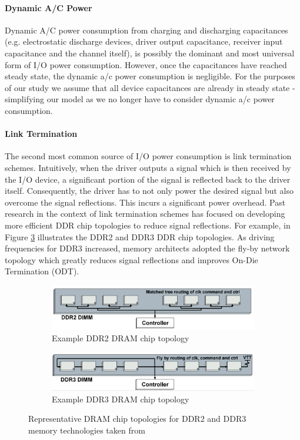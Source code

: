\paragraph{Dynamic A/C Power} Dynamic A/C power consumption from charging and
discharging capacitances (e.g. electrostatic discharge devices, driver output
capacitance, receiver input capacitance and the channel itself), is possibly
the dominant and most universal form of I/O power consumption. However, once
the capacitances have reached steady state, the dynamic a/c power consumption
is negligible. For the purposes of our study we assume that all device
capacitances are already in steady state - simplifying our model as we no
longer have to consider dynamic a/c power consumption.

\paragraph{Link Termination} The second most common source of I/O power
consumption is link termination schemes. Intuitively, when the driver
outputs a signal which is then received by the I/O device, a significant
portion of the signal is reflected back to the driver itself. Consequently, the
driver has to not only power the desired signal but also overcome the signal
reflections.  This incurs a significant power overhead. Past research in the
context of link termination schemes has focused on developing more efficient
DDR chip topologies to reduce signal reflections. For example, in Figure
\ref{dram-chips} illustrates the DDR2 and DDR3 DDR chip topologies. As driving
frequencies for DDR3 increased, memory architects adopted the fly-by network
topology which greatly reduces signal reflections and improves On-Die
Termination (ODT).

\begin{figure}[!htb]
  \centering
  \begin{subfigure}[b]{0.4\textwidth}
    \includegraphics[width=\textwidth]{figs/ddr2-topology}
    \caption{Example DDR2 DRAM chip topology}
    \label{fig:ddr2-chips}
  \end{subfigure}

  \begin{subfigure}[b]{0.4\textwidth}
    \includegraphics[width=\textwidth]{figs/ddr3-topology}
    \caption{Example DDR3 DRAM chip topology}
    \label{fig:ddr3-chips}
  \end{subfigure}
  \caption{Representative DRAM chip topologies for DDR2 and DDR3 memory
  technologies taken from \cite{ddr-design}}
  \label{dram-chips}
\end{figure}

